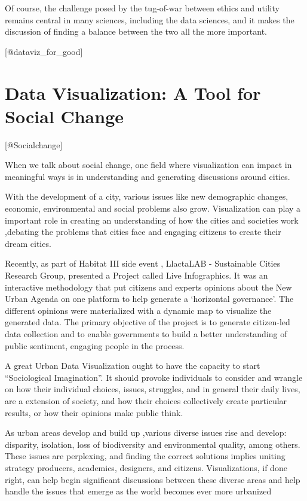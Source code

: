 \documentclass[]{book}
\theoremstyle{definition}
\theoremstyle{definition}
\theoremstyle{definition}
\theoremstyle{remark}
\begin{document}
Of course, the challenge posed by the tug-of-war between ethics and
utility remains central in many sciences, including the data sciences,
and it makes the discussion of finding a balance between the two all the
more important.

{[}@dataviz\_for\_good{]}

\section{Data Visualization: A Tool for Social
Change}\label{data-visualization-a-tool-for-social-change}

{[}@Socialchange{]}

When we talk about social change, one field where visualization can
impact in meaningful ways is in understanding and generating discussions
around cities.

With the development of a city, various issues like new demographic
changes, economic, environmental and social problems also grow.
Visualization can play a important role in creating an understanding of
how the cities and societies work ,debating the problems that cities
face and engaging citizens to create their dream cities.

Recently, as part of Habitat III side event , LlactaLAB - Sustainable
Cities Research Group, presented a Project called Live Infographics. It
was an interactive methodology that put citizens and experts opinions
about the New Urban Agenda on one platform to help generate a
`horizontal governance'. The different opinions were materialized with a
dynamic map to visualize the generated data. The primary objective of
the project is to generate citizen-led data collection and to enable
governments to build a better understanding of public sentiment,
engaging people in the process.

A great Urban Data Visualization ought to have the capacity to start
``Sociological Imagination''. It should provoke individuals to consider
and wrangle on how their individual choices, issues, struggles, and in
general their daily lives, are a extension of society, and how their
choices collectively create particular results, or how their opinions
make public think.

As urban areas develop and build up ,various diverse issues rise and
develop: disparity, isolation, loss of biodiversity and environmental
quality, among others. These issues are perplexing, and finding the
correct solutions implies uniting strategy producers, academics,
designers, and citizens. Visualizations, if done right, can help begin
significant discussions between these diverse areas and help handle the
issues that emerge as the world becomes ever more urbanized
\end{document}
